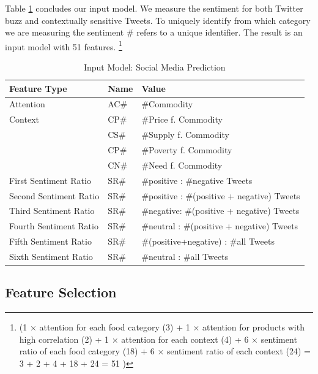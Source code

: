 Table \ref{tab:socio_feat} concludes our input model. We measure the sentiment for both Twitter buzz and contextually sensitive Tweets. To uniquely identify from which category we are measuring the sentiment  \# refers to a unique identifier. The result is an input model with 51 features. \footnote{ (1 $\times$ attention for each food category (3) + 1 $\times$ attention for products with high correlation (2) + 1 $\times$ attention for each context (4) +  6 $\times$ sentiment ratio of each food category (18) + 6 $\times$ sentiment ratio of each context (24) =  3 + 2 + 4 + 18 + 24  = 51 ) }
 

\begin{table}[H]
\centering
\begin{tabular}{ |p{5cm}|p{2cm}|p{7cm}| }



 Feature Type & Name & Value    \\
\hline
Attention & AC\# & \#Commodity   \\
\hline
Context & CP\# & \#Price f. Commodity   \\
        & CS\# & \#Supply f. Commodity  \\
        &CP\# & \#Poverty f. Commodity   \\
        &CN\# &\#Need f. Commodity  \\



  \hline
   First Sentiment Ratio & SR\#& \#positive : \#negative Tweets  \\
  Second Sentiment Ratio & SR\# & \#positive : \#(positive + negative) Tweets   \\
  Third Sentiment Ratio& SR\#  & \#negative: \#(positive + negative) Tweets  \\
   Fourth Sentiment Ratio  &SR\#   & \#neutral : \#(positive + negative) Tweets  \\
   Fifth Sentiment Ratio &SR\#  & \#(positive+negative) : \#all Tweets   \\                 
    Sixth Sentiment Ratio  &SR\#  & \#neutral : \#all Tweets \\
                          

   


\end{tabular}
\caption{Input Model: Social Media Prediction}
\label{tab:socio_feat}
\end{table}



\subsection{Feature Selection}

